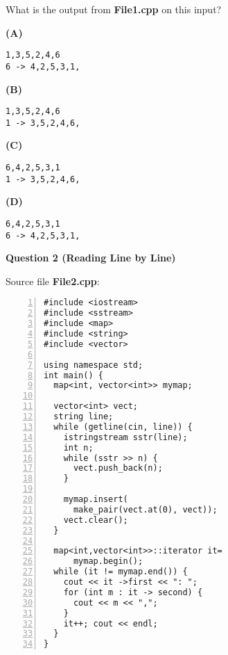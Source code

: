 \documentclass[11pt]{article}
\begin{document}
What is the output from {\bf File1.cpp} on this input?

\vspace{10pt}
{\bf (A)}
{\footnotesize
\begin{Verbatim}[frame=single]
1,3,5,2,4,6
6 -> 4,2,5,3,1,
\end{Verbatim}
}

\vspace{10pt}
{\bf (B)}
{\footnotesize
\begin{Verbatim}[frame=single]
1,3,5,2,4,6
1 -> 3,5,2,4,6,
\end{Verbatim}
}

\vspace{10pt}
{\bf (C)}
{\footnotesize
\begin{Verbatim}[frame=single]
6,4,2,5,3,1
1 -> 3,5,2,4,6,
\end{Verbatim}
}

\vspace{10pt}
{\bf (D)}
{\footnotesize
\begin{Verbatim}[frame=single]
6,4,2,5,3,1
6 -> 4,2,5,3,1,
\end{Verbatim}
}




\newpage
\vspace{20pt}
{\bf Question 2 (Reading Line by Line)}

\vspace{10pt}
Source file {\bf File2.cpp}:
{\footnotesize
\begin{center}
\begin{minipage}{.85\columnwidth}
\begin{Verbatim}[frame=single,numbers=left]
#include <iostream>
#include <sstream>
#include <map>
#include <string>
#include <vector>

using namespace std;
int main() {
  map<int, vector<int>> mymap;

  vector<int> vect;
  string line;
  while (getline(cin, line)) {
    istringstream sstr(line);
    int n;        
    while (sstr >> n) {
      vect.push_back(n);
    }
	
    mymap.insert(
      make_pair(vect.at(0), vect));
    vect.clear();
  }

  map<int,vector<int>>::iterator it= 
      mymap.begin();
  while (it != mymap.end()) {
    cout << it ->first << ": ";
    for (int m : it -> second) { 
      cout << m << ",";
    }
    it++; cout << endl;
  }
} 
\end{Verbatim}
\end{minipage}
\end{center}
}
\end{document}
